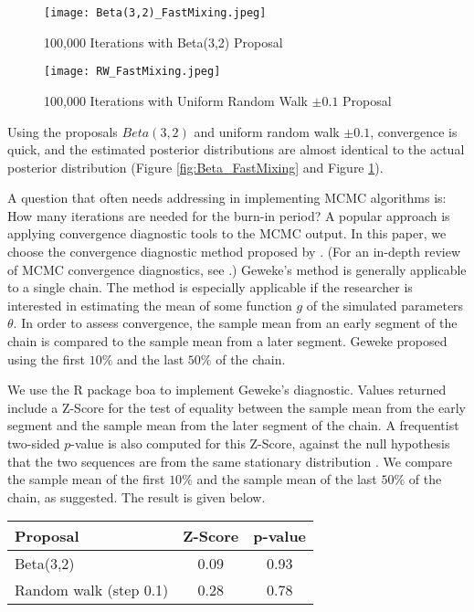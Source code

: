 \documentclass[12pt,openany]{article}
\theoremstyle{remark} %
\theoremstyle{definition} %
\begin{document}
\begin{figure}
\begin{center}\texttt{[image: Beta(3,2)\_FastMixing.jpeg]}\end{center}
\caption{100,000 Iterations with Beta(3,2) Proposal} \label{fig:Beta_FastMixing}

\begin{center}\texttt{[image: RW\_FastMixing.jpeg]}\end{center}
\caption{100,000 Iterations with Uniform Random Walk $\pm 0.1$ Proposal} \label{fig:RW_FastMixing}
\end{figure}

Using the proposals $Beta(3,2)$ and uniform random walk $\pm 0.1$, convergence is quick, and the estimated posterior distributions are almost identical to the actual posterior distribution (Figure \ref{fig:Beta_FastMixing} and Figure \ref{fig:RW_FastMixing}). 

A question that often needs addressing in implementing MCMC algorithms is: How many iterations are needed for the burn-in period? A popular approach is applying convergence diagnostic tools to the MCMC output. In this paper, we choose the convergence diagnostic method proposed by \citet{geweke}. (For an in-depth review of MCMC convergence diagnostics, see \citet{diagnosticsreview}.) Geweke's method is generally applicable to a single chain. The method is especially applicable if the researcher is interested in estimating the mean of some function $g$ of the simulated parameters $\theta$. In order to assess convergence, the sample mean from an early segment of the chain is compared to the sample mean from a later segment. Geweke proposed using the first $10\%$ and the last $50\%$ of the chain. 

We use the \textsf{R} package \textsf{boa} to implement Geweke's diagnostic. Values returned include a Z-Score for the test of equality between the sample mean from the early segment and the sample mean from the later segment of the chain. A frequentist two-sided $p$-value is also computed for this Z-Score, against the null hypothesis that the two sequences are from the same stationary distribution \citep{boapackage}. We compare the sample mean of the first $10\%$ and the sample mean of the last $50\%$ of the chain, as suggested. The result is given below.

\bigskip

\begin{minipage}{\linewidth}
\centering
{} \label{tab:summary} 
\begin{tabular}{lcc}
\toprule[1.5pt]
Proposal & Z-Score & p-value \\
\midrule
Beta(3,2) & 0.09 & 0.93 \\
Random walk (step 0.1) & 0.28  & 0.78\\
\bottomrule[1.25pt]
\end {tabular}\par
\bigskip
\end{minipage}
\end{document}
